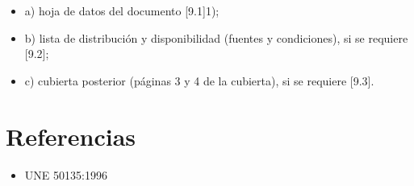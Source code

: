 \begin{Form}
\begin{itemize}
    \item a) hoja de datos del documento [9.1]1);
    \item b) lista de distribución y disponibilidad (fuentes y condiciones), si se requiere [9.2];
    \item c) cubierta posterior (páginas 3 y 4 de la cubierta), si se requiere [9.3].
\end{itemize}












































\section{Referencias}
\begin{itemize}
    \item UNE 50135:1996

\end{itemize}

\end{Form}

